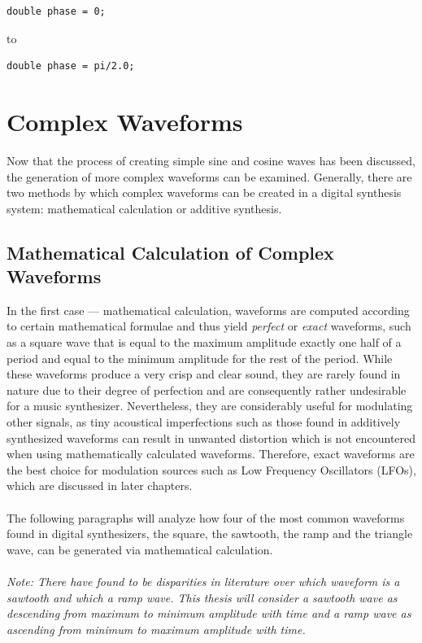 \documentclass[12pt,twoside]{report}
\begin{document}
\begin{lstlisting}[firstnumber=22]
  double phase = 0;
\end{lstlisting}
to
\begin{lstlisting}[firstnumber=22]
  double phase = pi/2.0;
\end{lstlisting}

\section{Complex Waveforms}

Now that the process of creating simple sine and cosine waves has been discussed, the generation of more complex waveforms can be examined. Generally, there are two methods by which complex waveforms can be created in a digital synthesis system: mathematical calculation or additive synthesis.

\subsection{Mathematical Calculation of Complex Waveforms}

In the first case --- mathematical calculation, waveforms are computed according to certain mathematical formulae and thus yield \emph{perfect} or \emph{exact} waveforms, such as a square wave that is equal to the maximum amplitude exactly one half of a period and equal to the minimum amplitude for the rest of the period. While these waveforms produce a very crisp and clear sound, they are rarely found in nature due to their degree of perfection and are consequently rather undesirable for a music synthesizer. Nevertheless, they are considerably useful for modulating other signals, as tiny acoustical imperfections such as those found in additively synthesized waveforms can result in unwanted distortion which is not encountered when using mathematically calculated waveforms. Therefore, exact waveforms are the best choice for modulation sources such as Low Frequency Oscillators (LFOs), which are discussed in later chapters. \\\\
The following paragraphs will analyze how four of the most common waveforms found in digital synthesizers, the square, the sawtooth, the ramp and the triangle wave, can be generated via mathematical calculation.\\\\
\emph{Note: There have found to be disparities in literature over which waveform is a sawtooth and which a ramp wave. This thesis will consider a sawtooth wave as descending from maximum to minimum amplitude with time and a ramp wave as ascending from minimum to maximum amplitude with time.}
\end{document}
